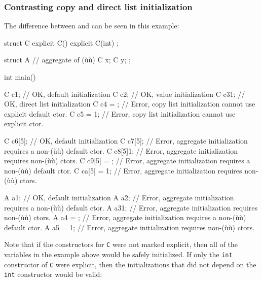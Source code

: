 \subsubsection[Contrasting copy and direct list initialization]{Contrasting copy and direct list initialization}\label{contrasting-copy-and-direct-list-initialization}

The difference between  and
 can be seen in this example:

\begin{emcppslisting}
struct C
{
    explicit C() { }
    explicit C(int) { }
};

struct A  // aggregate of (ù{}ù)
{
    C x;
    C y;
};

int main()
{
    C c1;           // OK, default initialization
    C c2{};         // OK, value initialization
    C c3{1};        // OK, direct list initialization
    C c4 = {};      // Error, copy list initialization cannot use explicit default ctor.
    C c5 = {1};     // Error, copy list initialization cannot use explicit ctor.

    C c6[5];        // OK, default initialization
    C c7[5]{};      // Error, aggregate initialization requires a non-(ù{}ù) default ctor.
    C c8[5]{1};     // Error, aggregate initialization requires non-(ù{}ù) ctors.
    C c9[5] = {};   // Error, aggregate initialization requires a non-(ù{}ù) default ctor.
    C ca[5] = {1};  // Error, aggregate initialization requires non-(ù{}ù) ctors.

    A a1;           // OK, default initialization
    A a2{};         // Error, aggregate initialization requires a non-(ù{}ù) default ctor.
    A a3{1};        // Error, aggregate initialization requires non-(ù{}ù) ctors.
    A a4 = {};      // Error, aggregate initialization requires a non-(ù{}ù) default ctor.
    A a5 = {1};     // Error, aggregate initialization requires non-(ù{}ù) ctors.
}
\end{emcppslisting}


\noindent Note that if the constructors for \lstinline!C! were not marked explicit,
then all of the variables in the example above would be safely
initialized. If only the \lstinline!int! constructor of \lstinline!C! were
explicit, then the initializations that did not depend on the
\lstinline!int! constructor would be valid:


